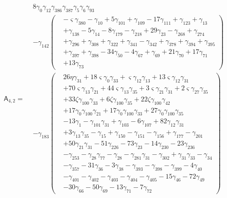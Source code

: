 \[\mathsf A_{4,2}=\begin{aligned}& 8 \gamma_{0} \gamma_{12} \gamma_{386} \gamma_{387} \gamma_{5} \gamma_{6} \gamma_{93}\\&- \gamma_{142} \left(\begin{aligned}&- \varsigma  \gamma_{380}- \gamma_{10}+ 5 \gamma_{101}+ \gamma_{109}- 17 \gamma_{111}+ \gamma_{123}+ \gamma_{13}\\&+ \gamma_{138}- 5 \gamma_{14}- 8 \gamma_{179}- \gamma_{218}+ 29 \gamma_{23}- \gamma_{268}+ \gamma_{274}\\&+ \gamma_{296}+ \gamma_{308}+ \gamma_{322}+ \gamma_{341}- \gamma_{342}+ \gamma_{378}+ \gamma_{394}+ \gamma_{395}\\&+ \gamma_{397}+ \gamma_{398}- 34 \gamma_{50}- 4 \gamma_{67}+ \gamma_{69}+ 21 \gamma_{70}+ 17 \gamma_{71}\\&+ 13 \gamma_{73}\end{aligned}\right)\\&- \gamma_{183} \left(\begin{aligned}& 26 \eta  \gamma_{31}+ 18 \varsigma  \gamma_{0} \gamma_{33}+ \varsigma  \gamma_{12} \gamma_{13}+ 13 \varsigma  \gamma_{12} \gamma_{31}\\&+ 70 \varsigma  \gamma_{13} \gamma_{21}+ 44 \varsigma  \gamma_{13} \gamma_{35}+ 3 \varsigma  \gamma_{21} \gamma_{31}+ 2 \varsigma  \gamma_{27} \gamma_{35}\\&+ 33 \zeta  \gamma_{100} \gamma_{33}+ 6 \zeta  \gamma_{100} \gamma_{35}+ 22 \zeta  \gamma_{100} \gamma_{42}\\&+ 17 \gamma_{0} \gamma_{100} \gamma_{21}+ 17 \gamma_{0} \gamma_{100} \gamma_{33}+ 27 \gamma_{0} \gamma_{100} \gamma_{35}\\&- 13 \gamma_{1}- \gamma_{101} \gamma_{31}+ \gamma_{103}- 6 \gamma_{107}+ 82 \gamma_{12} \gamma_{31}\\&+ 3 \gamma_{13} \gamma_{35}- \gamma_{15}+ \gamma_{150}- \gamma_{151}- \gamma_{156}+ \gamma_{177}- \gamma_{201}\\&+ 50 \gamma_{21} \gamma_{31}- 51 \gamma_{226}- 73 \gamma_{23}- 14 \gamma_{230}- 23 \gamma_{236}\\&- \gamma_{253}- \gamma_{28} \gamma_{77}- \gamma_{28}- \gamma_{281} \gamma_{31}- \gamma_{302}+ \gamma_{31} \gamma_{33}- \gamma_{34}\\&- \gamma_{357}- 31 \gamma_{36}- 3 \gamma_{38}- \gamma_{393}- \gamma_{398}- \gamma_{399}- 4 \gamma_{40}\\&- \gamma_{401}- \gamma_{402}- \gamma_{403}- \gamma_{404}- \gamma_{405}- 15 \gamma_{46}- 72 \gamma_{49}\\&- 30 \gamma_{66}- 50 \gamma_{69}- 13 \gamma_{71}- 7 \gamma_{72}\end{aligned}\right)\end{aligned}\]

